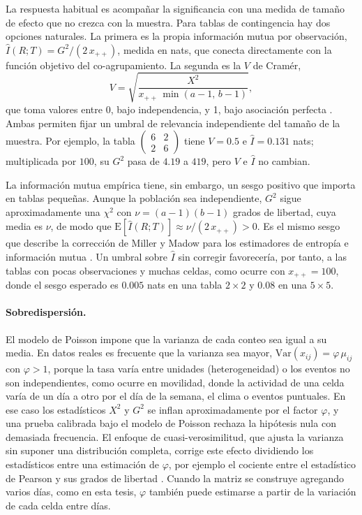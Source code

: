 La respuesta habitual es acompañar la significancia con una medida de tamaño de
efecto que no crezca con la muestra. Para tablas de contingencia hay dos opciones
naturales. La primera es la propia información mutua por observación,
$\hat I(R;T) = G^2/(2\,x_{++})$, medida en nats, que conecta directamente con la
función objetivo del co-agrupamiento. La segunda es la $V$ de Cramér,
\begin{equation}\label{eq:cramer}
  V = \sqrt{\frac{X^2}{x_{++}\,\min(a-1,\, b-1)}} ,
\end{equation}
que toma valores entre 0, bajo independencia, y 1, bajo asociación perfecta
\citep{Agresti2013}. Ambas permiten fijar un umbral de relevancia independiente
del tamaño de la muestra. Por ejemplo, la tabla $\begin{pmatrix} 6 & 2 \\ 2 & 6 \end{pmatrix}$ tiene $V = 0.5$ e $\hat I = 0.131$ nats; multiplicada por $100$, su $G^2$ pasa de $4.19$ a $419$, pero $V$ e $\hat I$ no cambian.

La información mutua empírica tiene, sin embargo, un sesgo positivo que importa
en tablas pequeñas. Aunque la población sea independiente, $G^2$ sigue
aproximadamente una $\chi^2$ con $\nu = (a-1)(b-1)$ grados de libertad, cuya
media es $\nu$, de modo que $\mathrm{E}[\hat I(R;T)] \approx \nu/(2\,x_{++}) > 0$.
Es el mismo sesgo que describe la corrección de Miller y Madow para los
estimadores de entropía e información mutua \citep{Paninski2003}. Un umbral
sobre $\hat I$ sin corregir favorecería, por tanto, a las tablas con pocas observaciones y muchas celdas, como ocurre con $x_{++} = 100$, donde el sesgo esperado es $0.005$ nats en una tabla $2 \times 2$ y $0.08$ en una $5 \times 5$.

\paragraph{Sobredispersión.} El modelo de Poisson impone que la varianza de cada
conteo sea igual a su media. En datos reales es frecuente que la varianza sea
mayor, $\mathrm{Var}(x_{ij}) = \varphi\,\mu_{ij}$ con $\varphi > 1$, porque la
tasa varía entre unidades (heterogeneidad) o los eventos no son independientes,
como ocurre en movilidad, donde la actividad de una celda varía de un
día a otro por el día de la semana, el clima o eventos puntuales. En ese caso los
estadísticos $X^2$ y $G^2$ se inflan aproximadamente por el factor $\varphi$, y
una prueba calibrada bajo el modelo de Poisson rechaza la hipótesis nula con
demasiada frecuencia. El enfoque de cuasi-verosimilitud, que ajusta la varianza sin suponer una distribución completa, corrige este efecto
dividiendo los estadísticos entre una estimación de $\varphi$, por ejemplo el
cociente entre el estadístico de Pearson y sus grados de libertad
\citep{McCullagh1989}. Cuando la matriz se construye agregando varios días, como en
esta tesis, $\varphi$ también puede estimarse a partir de la variación de cada
celda entre días.

